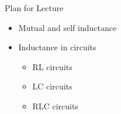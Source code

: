 
%
%

\renewcommand{\lecturesummarytitle}{Main points to remember }


%
%

\begin{frame}{Plan for Lecture \nextlecture}

\begin{itemize}
\item Mutual and self inductance
\vspace{0.2cm}
\item Inductance in circuits
  \begin{itemize}
      \item RL circuits
      \item LC circuits
      \item RLC circuits
  \end{itemize}
\end{itemize}

\end{frame}

